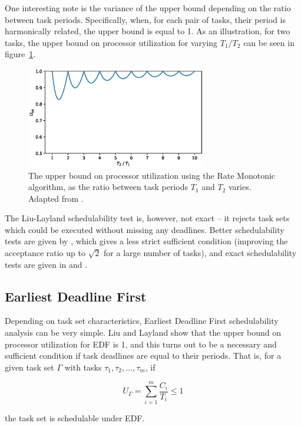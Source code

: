 \documentclass[twoside]{uva-inf-bachelor-thesis}
\begin{document}
One interesting note is the variance of the upper bound depending on the ratio between task periods. Specifically, when, for each pair of tasks, their period is harmonically related\cite[\S 4]{Buttazzo2005}, the upper bound is equal to 1. As an illustration, for two tasks, the upper bound on processor utilization for varying $T_1 / T_2$ can be seen in figure~\ref{fig:ubk}.

\begin{figure}[htpb]
    \centering
    \includegraphics[width=0.7\textwidth]{ub_rm_2tasks.eps}
    \caption{The upper bound on processor utilization using the Rate Monotonic algorithm, as the ratio between task periods $T_1$ and $T_2$ varies. Adapted from \textcite{buttazzo2011hard}.}
    \label{fig:ubk}
\end{figure}

The Liu-Layland schedulability test is, however, not exact -- it rejects task sets which could be executed without missing any deadlines. Better schedulability tests are given by \textcite{Bini2003}, which gives a less strict sufficient condition (improving the acceptance ratio up to $\sqrt{2}$ for a large number of tasks), and exact schedulability tests are given in \textcite{Lehoczky1989} and \textcite{Audsley1993}.

\subsection{Earliest Deadline First}
Depending on task set characteristics, Earliest Deadline First schedulability analysis can be very simple. Liu and Layland show that the upper bound on processor utilization for EDF is 1, and this turns out to be a necessary and sufficient condition if task deadlines are equal to their periods. That is, for a given task set $\Gamma$ with tasks $\tau_1, \tau_2, \ldots, \tau_m$, if

\[ U_\Gamma = \sum_{i=1}^m \dfrac{C_i}{T_i} \le 1 \]

\noindent the task set is schedulable under EDF.
\end{document}
